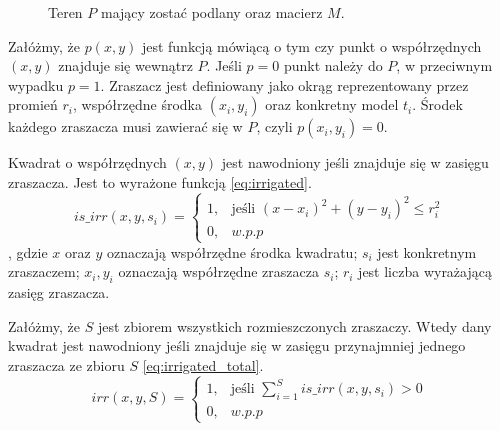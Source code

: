 \documentclass[twoside]{iisthesis}
\begin{document}
\begin{figure}[!htb]
	\centering
	\caption{Teren $P$ mający zostać podlany oraz macierz $M$.}
	\label{fig:matrix_m}
\end{figure}
Załóżmy, że $p(x,y)$ jest funkcją mówiącą o tym czy punkt o współrzędnych $(x, y)$ znajduje się wewnątrz $P$. Jeśli $p = 0$ punkt należy do $P$, w przeciwnym wypadku $p=1$. Zraszacz jest definiowany jako okrąg reprezentowany przez promień $r_{i}$, współrzędne środka $(x_i, y_i)$ oraz konkretny model $t_{i}$. Środek każdego zraszacza musi zawierać się w $P$, czyli $p(x_{i}, y_{i}) = 0$.

Kwadrat o współrzędnych $(x,y)$ jest nawodniony jeśli znajduje się w zasięgu zraszacza. Jest to wyrażone funkcją \eqref{eq:irrigated}.
\begin{equation}\label{eq:irrigated}
	is\_irr(x, y, s_{i}) = \begin{cases}
							1,& \text{jeśli } (x - x_{i})^{2} + (y - y_{i})^2 \leq r_{i}^{2}\\
							0,& w.p.p
						  \end{cases}
\end{equation}
, gdzie $x$ oraz $y$ oznaczają współrzędne środka kwadratu; $s_{i}$ jest konkretnym zraszaczem; $x_{i}, y_{i}$ oznaczają współrzędne zraszacza $s_{i}$; $r_{i}$ jest liczba wyrażającą zasięg zraszacza.

Załóżmy, że $S$ jest zbiorem wszystkich rozmieszczonych zraszaczy. Wtedy dany kwadrat jest nawodniony jeśli znajduje się w zasięgu przynajmniej jednego zraszacza ze zbioru $S$ \eqref{eq:irrigated_total}.
\begin{equation}\label{eq:irrigated_total}
	irr(x, y, S) = \begin{cases}
				   	1,& \text{jeśli } \sum_{i=1}^{S} is\_irr(x,y,s_{i}) > 0 \\
				   	0,& w.p.p			   	
				   \end{cases}
\end{equation}
\end{document}
